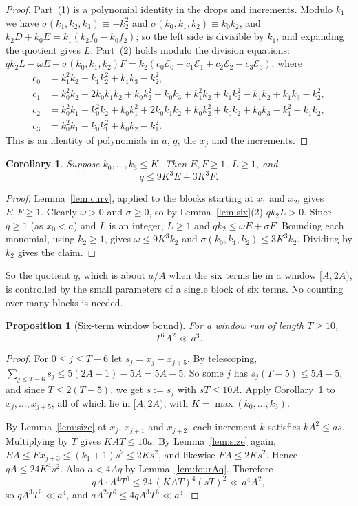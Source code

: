 \documentclass[11pt]{article}
\newtheorem{proposition}[theorem]{Proposition}
\newtheorem{corollary}[theorem]{Corollary}
\theoremstyle{definition}
\theoremstyle{remark}
\begin{document}
\begin{proof}
Part~(1) is a polynomial identity in the drops and increments. Modulo $k_1$
we have $\sigma(k_1,k_2,k_3)\equiv-k_2^2$ and $\sigma(k_0,k_1,k_2)\equiv k_0k_2$,
and $k_2D+k_0E=k_1(k_2f_0-k_0f_2)$; so the left side is divisible by $k_1$, and
expanding the quotient gives $L$. Part~(2) holds modulo the division
equations: $qk_2L-\omega E-\sigma(k_0,k_1,k_2)F=k_2(c_0\mathcal E_0-c_1\mathcal E_1+c_2\mathcal E_2-c_3\mathcal E_3)$, where
\begin{align*}
c_0&=k_1^2k_2+k_1k_2^2+k_1k_3-k_2^2,\\
c_1&=k_0^2k_2+2k_0k_1k_2+k_0k_2^2+k_0k_3+k_1^2k_2+k_1k_2^2-k_1k_2+k_1k_3-k_2^2,\\
c_2&=k_0^2k_1+k_0^2k_2+k_0k_1^2+2k_0k_1k_2+k_0k_2^2+k_0k_2+k_0k_3-k_1^2-k_1k_2,\\
c_3&=k_0^2k_1+k_0k_1^2+k_0k_2-k_1^2.
\end{align*}
This is an identity of polynomials in $a$, $q$, the $x_j$ and the increments.
\end{proof}

\begin{corollary}\label{cor:six}
Suppose $k_0,\dots,k_3\le K$. Then $E,F\ge1$, $L\ge1$, and
\[
q\le 9K^3E+3K^3F .
\]
\end{corollary}

\begin{proof}
Lemma~\ref{lem:curv}, applied to the blocks starting at $x_1$ and $x_2$, gives $E,F\ge1$.
Clearly $\omega>0$ and $\sigma\ge0$, so by Lemma~\ref{lem:six}(2) $qk_2L>0$. Since $q\ge1$ (as
$x_0<a$) and $L$ is an integer, $L\ge1$ and $qk_2\le \omega E+\sigma F$. Bounding each monomial, using $k_2\ge1$, gives $\omega\le 9K^3k_2$ and
$\sigma(k_0,k_1,k_2)\le 3K^3k_2$. Dividing by $k_2$ gives the claim.
\end{proof}

So the quotient $q$, which is about $a/A$ when the six terms lie in a window $[A,2A)$, is controlled by the small parameters of a single block
of six terms. No counting over many blocks is needed.

\begin{proposition}[Six-term window bound]\label{prop:six}
For a window run of length $T\ge10$,
\[
T^6A^2\ll a^3 .
\]
\end{proposition}

\begin{proof}
For $0\le j\le T-6$ let $s_j=x_j-x_{j+5}$. By telescoping,
$\sum_{j\le T-6}s_j\le 5(2A-1)-5A=5A-5$. So some $j$ has $s_j(T-5)\le 5A-5$, and since
$T\le 2(T-5)$, we get $s:=s_j$ with $sT\le 10A$. Apply Corollary~\ref{cor:six} to
$x_j,\dots,x_{j+5}$, all of which lie in $[A,2A)$, with $K=\max(k_0,\dots,k_3)$.

By Lemma~\ref{lem:size} at $x_j$, $x_{j+1}$ and $x_{j+2}$, each increment $k$ satisfies
$kA^2\le a s$. Multiplying by $T$ gives $KAT\le 10a$. By
Lemma~\ref{lem:size} again, $EA\le Ex_{j+3}\le(k_1+1)s^2\le 2Ks^2$, and likewise $FA\le 2Ks^2$.
Hence $qA\le 24K^4s^2$. Also $a<4Aq$ by Lemma~\ref{lem:fourAq}. Therefore
\[
qA\cdot A^4T^6\le 24\,(KAT)^4(sT)^2\ll a^4A^2,
\]
so $qA^3T^6\ll a^4$, and $aA^2T^6\le 4qA^3T^6\ll a^4$.
\end{proof}
\end{document}

